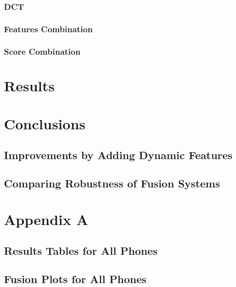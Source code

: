 \documentclass[11pt,a4paper]{tesis}
\begin{document}
		\subsection{DCT}
		\subsection{Features Combination}
		\subsection{Score Combination}

\chapter{Results}
	

\chapter{Conclusions}
	\section{Improvements by Adding Dynamic Features}
	\section{Comparing Robustness of Fusion Systems}

\chapter{Appendix A}
	\section{Results Tables for All Phones}
		
	\section{Fusion Plots for All Phones}
		

\printbibliography
 
\end{document}

